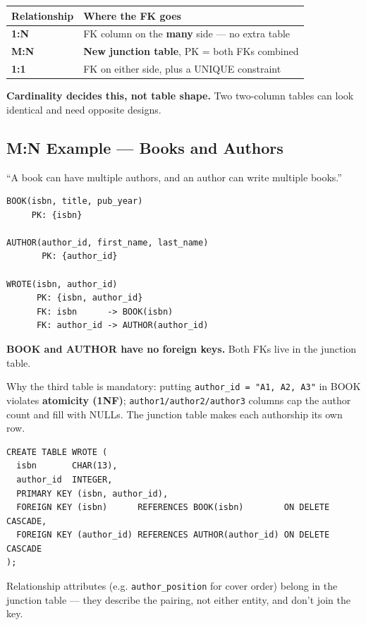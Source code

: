 \documentclass[12pt]{article}
\begin{document}
\begin{table}[H]
\centering
\begin{tabular}{|l|l|}
\hline
\textbf{Relationship} & \textbf{Where the FK goes} \\
\hline
\textbf{1:N} & FK column on the \textbf{many} side --- no extra table \\
\textbf{M:N} & \textbf{New junction table}, PK = both FKs combined \\
\textbf{1:1} & FK on either side, plus a UNIQUE constraint \\
\hline
\end{tabular}
\end{table}

\textbf{Cardinality decides this, not table shape.} Two two-column tables can
look identical and need opposite designs.

\subsection*{M:N Example --- Books and Authors}

``A book can have multiple authors, and an author can write multiple books.''

\begin{lstlisting}[style=plainschema]
BOOK(isbn, title, pub_year)
     PK: {isbn}

AUTHOR(author_id, first_name, last_name)
       PK: {author_id}

WROTE(isbn, author_id)
      PK: {isbn, author_id}
      FK: isbn      -> BOOK(isbn)
      FK: author_id -> AUTHOR(author_id)
\end{lstlisting}

\textbf{BOOK and AUTHOR have no foreign keys.} Both FKs live in the junction table.

Why the third table is mandatory: putting \texttt{author\_id = "A1, A2, A3"} in
BOOK violates \textbf{atomicity (1NF)}; \texttt{author1/author2/author3} columns
cap the author count and fill with NULLs. The junction table makes each
authorship its own row.

\begin{lstlisting}[style=sqlstyle]
CREATE TABLE WROTE (
  isbn       CHAR(13),
  author_id  INTEGER,
  PRIMARY KEY (isbn, author_id),
  FOREIGN KEY (isbn)      REFERENCES BOOK(isbn)        ON DELETE CASCADE,
  FOREIGN KEY (author_id) REFERENCES AUTHOR(author_id) ON DELETE CASCADE
);
\end{lstlisting}

Relationship attributes (e.g. \texttt{author\_position} for cover order) belong
in the junction table --- they describe the pairing, not either entity, and
don't join the key.
\end{document}
